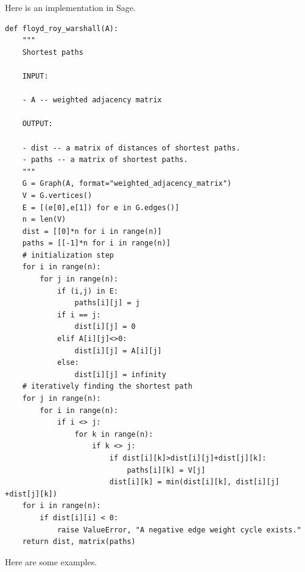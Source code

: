 Here is an implementation in Sage.
\begin{lstlisting}
def floyd_roy_warshall(A):
    """
    Shortest paths

    INPUT:

    - A -- weighted adjacency matrix

    OUTPUT:

    - dist -- a matrix of distances of shortest paths.
    - paths -- a matrix of shortest paths.
    """
    G = Graph(A, format="weighted_adjacency_matrix")
    V = G.vertices()
    E = [(e[0],e[1]) for e in G.edges()]
    n = len(V)
    dist = [[0]*n for i in range(n)]
    paths = [[-1]*n for i in range(n)]
    # initialization step
    for i in range(n):
        for j in range(n):
            if (i,j) in E:
                paths[i][j] = j
            if i == j:
                dist[i][j] = 0
            elif A[i][j]<>0:
                dist[i][j] = A[i][j]
            else:
                dist[i][j] = infinity
    # iteratively finding the shortest path
    for j in range(n):
        for i in range(n):
            if i <> j:
                for k in range(n):
                    if k <> j:
                        if dist[i][k]>dist[i][j]+dist[j][k]:
                            paths[i][k] = V[j]
                        dist[i][k] = min(dist[i][k], dist[i][j] +dist[j][k])
    for i in range(n):
        if dist[i][i] < 0:
            raise ValueError, "A negative edge weight cycle exists."
    return dist, matrix(paths)
\end{lstlisting}

Here are some examples.

%
%
%
%

%
%
%
%

